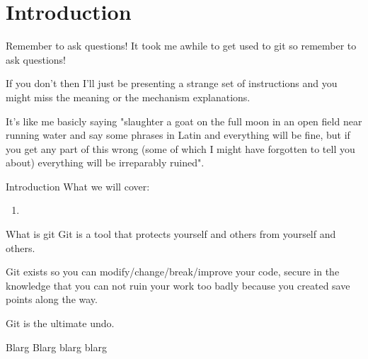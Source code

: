 \documentclass[../git.tex]{subfiles}
\begin{document}
\section{Introduction}


\begin{frame}[fragile]{Remember to ask questions!}
    It took me awhile to get used to git so remember to ask questions! \newline

    If you don't then I'll just be presenting a strange set of instructions and
    you might miss the meaning or the mechanism explanations. \newline

    It's like me basicly saying "slaughter a goat on the full moon in an open
    field near running water and say some phrases in Latin and everything will be
    fine, but if you get any part of this wrong (some of which I might have
    forgotten to tell you about) everything will be irreparably ruined".
\end{frame}


\begin{frame}[fragile]{Introduction}
    What we will cover:
    \begin{enumerate}
        \item
    \end{enumerate}
\end{frame}


\begin{frame}[fragile]{What is git}
    Git is a tool that protects yourself and others from yourself and others. \newline

    Git exists so you can modify/change/break/improve your code, secure in the
    knowledge that you can not ruin your work too badly because you created save
    points along the way.

    \note
    {
        Git is the ultimate undo.
    }
\end{frame}


\begin{frame}[fragile]{Blarg}
    Blarg blarg blarg
\end{frame}

\end{document}
